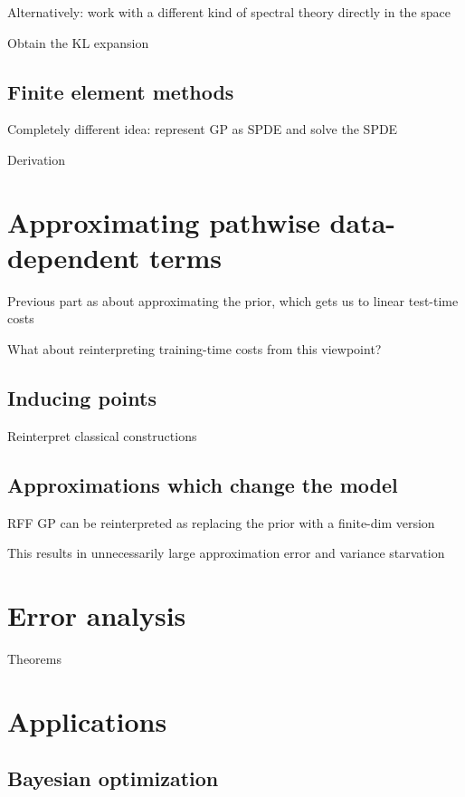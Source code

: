 \documentclass[11pt]{book}
\begin{document}
Alternatively: work with a different kind of spectral theory directly in the space

Obtain the KL expansion

\subsection{Finite element methods}

Completely different idea: represent GP as SPDE and solve the SPDE

Derivation

\section{Approximating pathwise data-dependent terms}

Previous part as about approximating the prior, which gets us to linear test-time costs

What about reinterpreting training-time costs from this viewpoint?

\subsection{Inducing points}

Reinterpret classical constructions

\subsection{Approximations which change the model}

RFF GP can be reinterpreted as replacing the prior with a finite-dim version

This results in unnecessarily large approximation error and variance starvation

\section{Error analysis}

Theorems

\section{Applications}

\subsection{Bayesian optimization}
\end{document}
